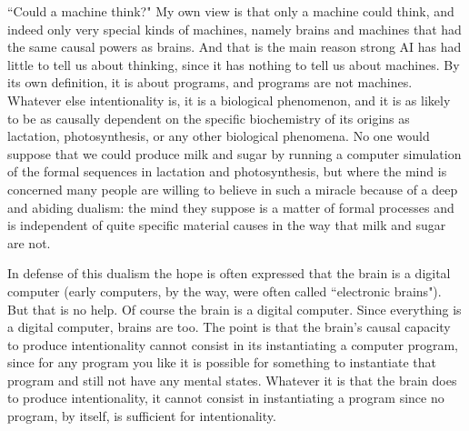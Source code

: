 ``Could a machine think?" My own view is that only a machine could think, and indeed only very special kinds
of machines, namely brains and machines that had the same causal powers as brains. And that is the main
reason strong AI has had little to tell us about thinking, since it has nothing to tell us about machines. By its own
definition, it is about programs, and programs are not machines. Whatever else intentionality is, it is a biological
phenomenon, and it is as likely to be as causally dependent on the specific biochemistry of its origins as
lactation, photosynthesis, or any other biological phenomena. No one would suppose that we could produce
milk and sugar by running a computer simulation of the formal sequences in lactation and photosynthesis, but
where the mind is concerned many people are willing to believe in such a miracle because of a deep and abiding
dualism: the mind they suppose is a matter of formal processes and is independent of quite specific material
causes in the way that milk and sugar are not.

In defense of this dualism the hope is often expressed that the brain is a digital computer (early computers, by
the way, were often called ``electronic brains"). But that is no help. Of course the brain is a digital computer.
Since everything is a digital computer, brains are too. The point is that the brain's causal capacity to produce
intentionality cannot consist in its instantiating a computer program, since for any program you like it is possible
for something to instantiate that program and still not have any mental states. Whatever it is that the brain does
to produce intentionality, it cannot consist in instantiating a program since no program, by itself, is sufficient for
intentionality.

\setcounter{footnote}{\thefn}